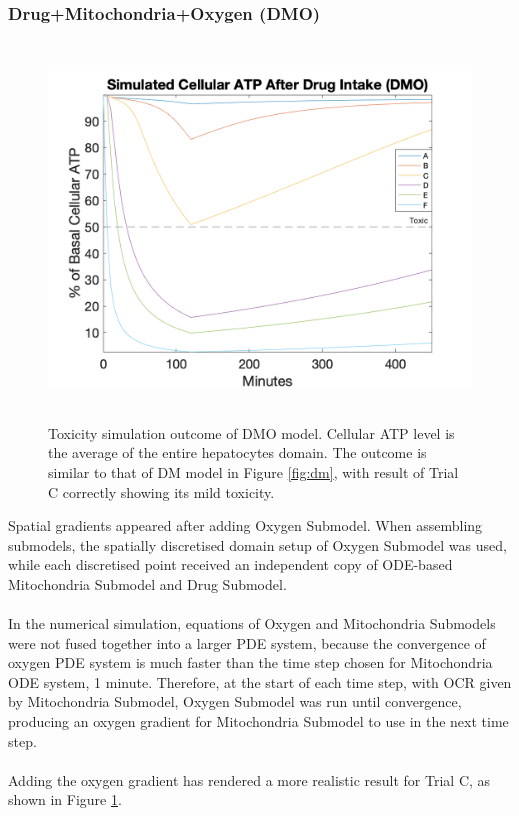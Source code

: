 \documentclass[12pt]{article}
\begin{document}
\subsubsection{Drug+Mitochondria+Oxygen (DMO)}
\begin{figure}[h!]
\centering
\includegraphics[width = 12cm, height =10cm]{dmo.png}
\caption{Toxicity simulation outcome of DMO model. Cellular ATP level is the average of the entire hepatocytes domain. The outcome is similar to that of DM model in Figure \ref{fig:dm}, with result of Trial C correctly showing its mild toxicity.}
\label{fig:dmo}
\end{figure}
Spatial gradients appeared after adding Oxygen Submodel. When assembling submodels, the spatially discretised domain setup of Oxygen Submodel was used, while each discretised point received an independent copy of ODE-based Mitochondria Submodel and Drug Submodel.\\\\
In the numerical simulation, equations of Oxygen and Mitochondria Submodels were not fused together into a larger PDE system, because the convergence of oxygen PDE system is much faster than the time step chosen for Mitochondria ODE system, 1 minute. Therefore, at the start of each time step, with OCR given by Mitochondria Submodel, Oxygen Submodel was run until convergence, producing an oxygen gradient for Mitochondria Submodel to use in the next time step.\\\\
Adding the oxygen gradient has rendered a more realistic result for Trial C, as shown in Figure \ref{fig:dmo}.
\end{document}
